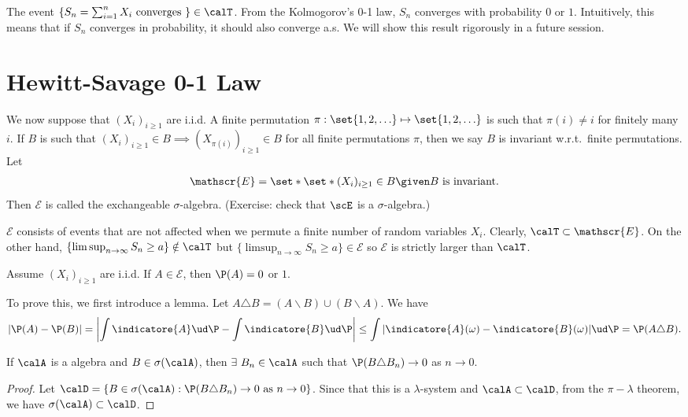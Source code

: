\documentclass[../aipt.tex]{subfiles}
\begin{document}
\begin{Example}
The event $\{S_n = \sum_{i=1}^n X_i \text{ converges } \}\in \calT$. From the Kolmogorov’s 0-1 law, $S_n$ converges with probability $0$ or $1$. Intuitively, this means that if $S_n$ converges in probability, it should also converge a.s. We will show this result rigorously in a future session.
\end{Example}

\section{Hewitt-Savage 0-1 Law}

We now suppose that $(X_i) _{i \geq 1 }$ are i.i.d. A finite permutation $\pi : \set{1,2,\ldots} \mapsto \set{1,2,\ldots}$ is such that $\pi(i)\neq i$ for finitely many $i$. If $B$ is such that $(X_i)_{i\geq1}\in B \implies (X_{\pi(i)})_{i\geq1}\in B$ for all finite permutations $\pi$, then we say $B$ is invariant w.r.t.\ finite permutations. Let 
\begin{align*}
\mathscr{E}=\set*{\set*{(X_i) _{i \geq 1 }\in B}\given B \text{ is invariant}}.
\end{align*}
Then $\mathscr{E}$ is called the exchangeable $\sigma$-algebra. (Exercise: check that $\scE$ is a $\sigma$-algebra.)

$\mathscr{E}$ consists of events that are not affected when we permute a finite number of random variables $X_i$. Clearly, $\calT \subset \mathscr{E}$. On the other hand, $\{\limsup_{n\to\infty} S_n\geq a\}\notin \calT$ but $\{\limsup_{n\to\infty} S_n\geq a\}\in \mathscr{E}$ so $\mathscr{E}$ is strictly larger than $\calT$.

\begin{Theorem} 
Assume $(X_i)_{i\geq 1}$ are i.i.d. If $A \in \mathscr{E}$, then $\P(A)=0$ or $1$.
\end{Theorem}

To prove this, we first introduce a lemma. Let $A\triangle B= (A\backslash B)\cup (B\backslash A)$. We have 
\begin{align*}
|\P(A)-\P(B)|= \left|\int \indicatore{A} \ud\P -\int \indicatore{B} \ud\P\right|\leq \int |\indicatore{A}(\omega)-\indicatore{B}(\omega)| \ud \P =\P(A\triangle B).
\end{align*}

\begin{Lemma}\label{wk8:lemma:Approximation Lemma}
If $\calA$ is a algebra and $B \in \sigma(\calA)$, then $\exists\ B_n \in \calA$ such that $\P(B\triangle B_n)\to 0$ as $n \to 0$. 
\end{Lemma}
\begin{proof}
Let $\calD=\{B\in \sigma(\calA): \P(B\triangle B_n)\to 0 \text{ as }  n \to 0 \}$. Since that this is a $\lambda$-system and $\calA \subset \calD$, from the $\pi-\lambda$ theorem, we have $\sigma(\calA) \subset \calD$. 
\end{proof}
\end{document}
